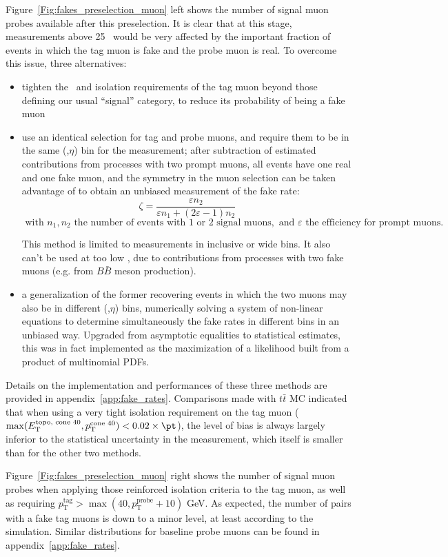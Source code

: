 Figure~\ref{Fig:fakes_preselection_muon} left shows the number of signal muon probes available after this preselection. 
It is clear that at this stage, measurements above 25 \GeV~would be very affected by the important fraction of events 
in which the tag muon is fake and the probe muon is real. 
To overcome this issue, three alternatives: 
\begin{itemize}
\item tighten the \pt\ and isolation requirements of the tag muon beyond those defining our usual ``signal'' category, 
to reduce its probability of being a fake muon
\item use an identical selection for tag and probe muons, and require them to be in the same (\pt,$\eta$) bin for the measurement; 
after subtraction of estimated contributions from processes with two prompt muons, all events have one real and one fake muon, 
and the symmetry in the muon selection can be taken advantage of to obtain an unbiased measurement of the fake rate: 
$$
\zeta = \frac{\varepsilon n_2}{\varepsilon n_1+(2\varepsilon-1)n_2}
$$
$\text{ with }n_1, n_2\text{ the number of events with 1 or 2 signal muons}, 
\text{ and }\varepsilon\text{ the efficiency for prompt muons.}$

This method is limited to measurements in inclusive or wide bins. 
It also can't be used at too low \pt, due to contributions from processes with two fake muons (e.g. from $B\bar B$ meson production). 
\item a generalization of the former recovering events in which the two muons may also be in different (\pt,$\eta$) bins, 
numerically solving a system of non-linear equations 
to determine simultaneously the fake rates in different bins in an unbiased way. 
Upgraded from asymptotic equalities to statistical estimates, 
this was in fact implemented as the maximization of a likelihood built from a product of multinomial PDFs. 
\end{itemize}
Details on the implementation and performances of these three methods are provided in appendix~\ref{app:fake_rates}. 
Comparisons made with $t\bar t$ MC indicated that when using a very tight isolation requirement on the tag muon 
($\operatorname{max}(E_\mathrm{T}^\text{topo, cone 40},p_\mathrm{T}^\text{cone 40})<0.02\times\pt$), 
the level of bias is always largely inferior to the statistical uncertainty in the measurement, 
which itself is smaller than for the other two methods. 

Figure~\ref{Fig:fakes_preselection_muon} right shows the number of signal muon probes when applying those reinforced isolation criteria to the tag muon, 
as well as requiring $p_\mathrm{T}^\text{tag}>\operatorname{max}(40,p_\mathrm{T}^\text{probe}+10)$ GeV. 
As expected, the number of pairs with a fake tag muons is down to a minor level, at least according to the simulation. 
Similar distributions for baseline probe muons can be found in appendix~\ref{app:fake_rates}. 

